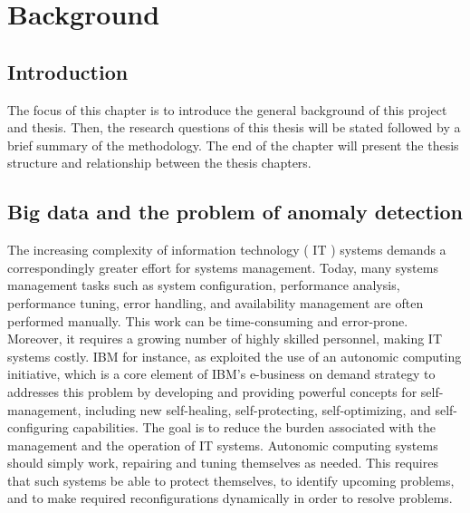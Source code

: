 \documentclass[12pt, letterpaper, titlepage]{report}
\begin{document}
\chapter{Background}
\section{Introduction}
The focus of this chapter is to introduce the general background of this project and thesis. Then, the research questions of this thesis will be stated followed by a brief summary of the methodology. The end of the chapter will present the thesis structure and relationship between the thesis chapters.
\section{Big data and the problem of anomaly detection}
The increasing complexity of information technology ( IT ) systems demands a correspondingly greater effort for systems management. Today, many systems management tasks such as system configuration, performance analysis, performance tuning, error handling, and availability management are often performed manually. This work can be time-consuming and error-prone. Moreover, it requires a growing number of highly skilled personnel, making IT systems costly. IBM for instance, as exploited the use of an autonomic computing initiative, which is a core element of IBM's e-business on demand strategy to addresses this problem by developing and providing powerful concepts for self-management, including new self-healing, self-protecting, self-optimizing, and self-configuring capabilities. The goal is to reduce the burden associated with the management and the operation of IT systems. Autonomic computing systems should simply work, repairing and tuning themselves as needed. This requires that such systems be able to protect themselves, to identify upcoming problems, and to make required reconfigurations dynamically in order to resolve problems.
\end{document}
